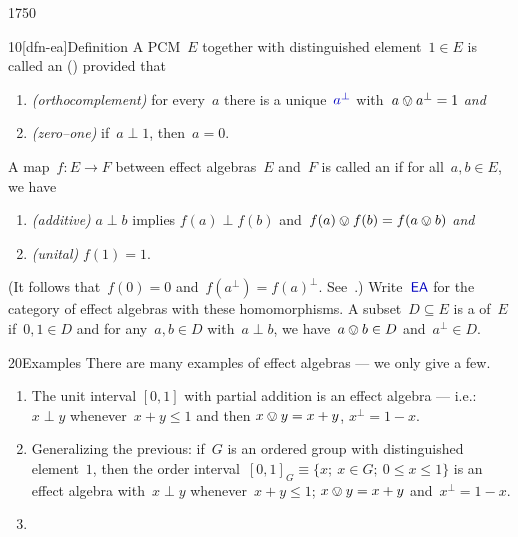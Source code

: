 \begin{parsec}{1750}%
\begin{point}{10}[dfn-ea]{Definition}%
A PCM~$E$ together with distinguished element~$1 \in E$
    is called an  () \cite{ea}
    provided that
\begin{enumerate}
\item
    \emph{(orthocomplement)}
    for every~$a$
    there is a unique~$\Define{a^\perp}$
   with~$a \ovee a^\perp = 1$ \emph{and}
\item
    \emph{(zero--one)}
    if~$a \perp 1$, then~$a = 0$.
\end{enumerate}
A map~$f\colon E \to F$
between effect algebras~$E$ and~$F$
is called an 
if for all~$a, b \in E$, we have
\begin{enumerate}
    \item \emph{(additive)}
    $a \perp b$ implies $f(a) \perp f(b)$ and~$f(a)\ovee f(b) = f(a\ovee b)$
        \emph{and}
    \item \emph{(unital)}
    $f(1) = 1$.
\end{enumerate}
(It follows that~$f(0)=0$ and~$f(a^\perp) = f(a)^\perp$. See~.)
Write~$\Define{\textsf{EA}}$
    for the category
    of effect algebras with these homomorphisms.
A subset~$D \subseteq E$ is a 
     of~$E$
    if~$0,1 \in D$ and for any~$a,b \in D$
    with~$a\perp b$, we have~$a \ovee b \in D$
    and~$a^\perp \in D$.
\end{point}
\begin{point}{20}{Examples}%
There are many examples of effect algebras
    --- we only give a few.
\begin{enumerate}
\item
The unit interval
$[0,1]$ with partial addition is an effect algebra ---
i.e.:~$x \perp y$
        whenever~$x +y \leq 1$ and then $x \ovee y = x + y$,
        $x^\perp = 1-x$.
\item
Generalizing the previous:
if~$G$ is an ordered group
with distinguished element~$1$,
then the order interval~$[0,1]_G \equiv \{x;\ x\in G;\ 0 \leq x\leq 1\}$
is an effect algebra
with~$x \perp y$ whenever~$x +y \leq 1$;
$x \ovee y = x + y$ and~$x^\perp = 1-x$.
\item

\end{enumerate}
\end{point}
\end{parsec}
